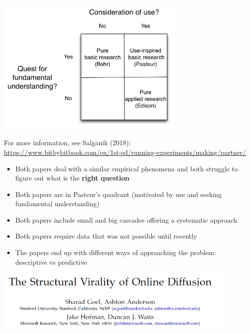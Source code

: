 \documentclass[aspectratio=169]{beamer}
\begin{document}
\begin{frame}

\begin{center}
\includegraphics[width=0.7\textwidth]{figures/bitbybit4-17_pasteurs_quadrant}
\end{center}

\vfill
For more information, see Salganik (2018): \url{https://www.bitbybitbook.com/en/1st-ed/running-experiments/making/partner/}
\end{frame}
\begin{frame}

\begin{itemize}
\item Both papers deal with a similar empirical phenomena and both struggle to figure out what is the \textbf{right question}
\item Both papers are in Pasteur's quadrant (motivated by use and seeking fundamental understanding)
\item Both papers include small and big cascades offering a systematic approach
\pause
\item Both papers require data that was not possible until recently
\pause
\item The papers end up with different ways of approaching the problem: descriptive vs predictive
\end{itemize}


\end{frame}
\begin{frame}

\begin{center}
\includegraphics[width=0.9\textwidth]{figures/goel_structural_2016_title}
\end{center}

\end{frame}
\end{document}
